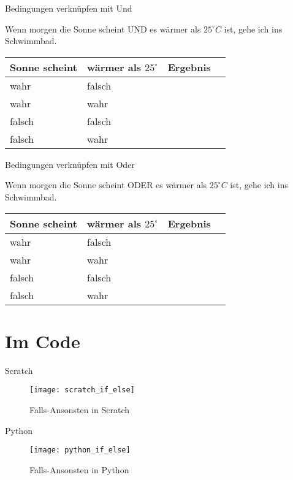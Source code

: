 \documentclass[xcolor=svgnames,handout,ngerman]{beamer}
\begin{document}
\begin{frame}
  {Bedingungen verknüpfen mit Und}

	Wenn morgen die Sonne scheint UND es wärmer als $25^{\circ}C$ ist, gehe ich ins Schwimmbad.
 \begin{table}[t,clr]
 	\begin{center}
 		\begin{tabular}{|l|l|l|l|}
 			\hline
 			Sonne scheint	& wärmer als $25^{\circ}$	& Ergebnis	\\ \hline\hline
 			wahr			& falsch					&			\\ \hline
 			wahr			& wahr						&			\\ \hline
 			falsch			& falsch					&			\\ \hline
 			falsch			& wahr						&			\\ \hline
 			
 		\end{tabular}
 	\end{center}
 \end{table}
\end{frame}

\begin{frame}
	{Bedingungen verknüpfen mit Oder}
	
	Wenn morgen die Sonne scheint ODER es wärmer als $25^{\circ}C$ ist, gehe ich ins Schwimmbad.
	\begin{table}[t,clr]
		\begin{center}
			\begin{tabular}{|l|l|l|l|}
				\hline
				Sonne scheint	& wärmer als $25^{\circ}$	& Ergebnis	\\ \hline\hline
				wahr			& falsch					&			\\ \hline
				wahr			& wahr						&			\\ \hline
				falsch			& falsch					&			\\ \hline
				falsch			& wahr						&			\\ \hline
				
			\end{tabular}
		\end{center}
	\end{table}
\end{frame}

\section{Im Code}

\begin{frame}
  {Scratch}

  \begin{figure}[t]
    \centering
    \texttt{[image: scratch\_if\_else]}
    \caption{Falls-Ansonsten in Scratch}
  \end{figure}
\end{frame}

\begin{frame}
	{Python}
	
	\begin{figure}[t]
		\centering
		\texttt{[image: python\_if\_else]}
		\caption{Falls-Ansonsten in Python}
	\end{figure}
\end{frame}
\end{document}
